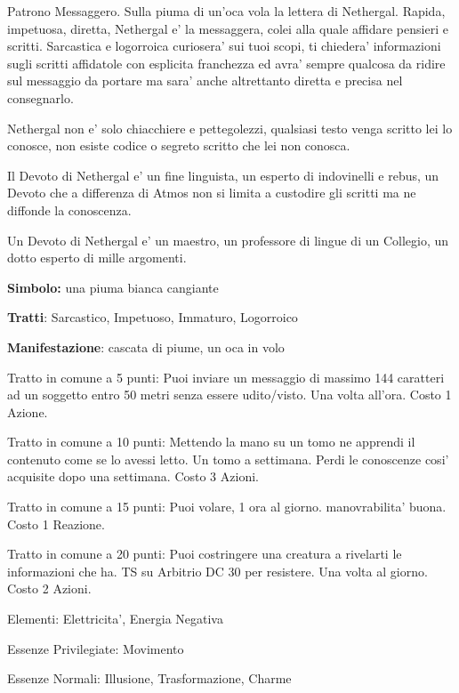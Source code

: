 \documentclass[a4paper,11pt,twoside,openany]{book}
\begin{document}
{		\label{nethergal}
		
		Patrono Messaggero. Sulla piuma di un'oca vola la lettera di Nethergal. Rapida, impetuosa, diretta, Nethergal e' la messaggera, colei alla quale affidare pensieri e scritti. Sarcastica e logorroica curiosera' sui tuoi scopi, ti chiedera' informazioni sugli scritti affidatole con esplicita franchezza ed avra' sempre qualcosa da ridire sul messaggio da portare ma sara' anche altrettanto diretta e precisa nel consegnarlo. 
		
		Nethergal non e' solo chiacchiere e pettegolezzi, qualsiasi testo venga scritto lei lo conosce, non esiste codice o segreto scritto che lei non conosca.
		
		Il Devoto di Nethergal e' un fine linguista, un esperto di indovinelli e rebus, un Devoto che a differenza di Atmos non si limita a custodire gli scritti ma ne diffonde la conoscenza.
		
		Un Devoto di Nethergal e' un maestro, un professore di lingue di un Collegio, un dotto esperto di mille argomenti.
		
		\textbf{Simbolo:} una piuma bianca cangiante
		
		\textbf{Tratti}: Sarcastico, Impetuoso, Immaturo, Logorroico
		
		\textbf{Manifestazione}: cascata di piume, un oca in volo
		
		\bigskip
		
		Tratto in comune a 5 punti: Puoi inviare un messaggio di massimo 144 caratteri ad un soggetto entro 50 metri senza essere udito/visto. Una volta all'ora. Costo 1 Azione.
		
		Tratto in comune a 10 punti: Mettendo la mano su un tomo ne apprendi il contenuto come se lo avessi letto. Un tomo a settimana. Perdi le conoscenze cosi' acquisite dopo una settimana. Costo 3 Azioni.
		
		Tratto in comune a 15 punti: Puoi volare, 1 ora al giorno. manovrabilita' buona. Costo 1 Reazione.
		
		Tratto in comune a 20 punti: Puoi costringere una creatura a rivelarti le informazioni che ha. TS su Arbitrio DC 30 per resistere. Una volta al giorno. Costo 2 Azioni.
		
		\bigskip
		
		Elementi: Elettricita', Energia Negativa
		
		\bigskip
		
		Essenze Privilegiate: Movimento
		
		Essenze Normali: Illusione, Trasformazione, Charme
		
}
\end{document}
